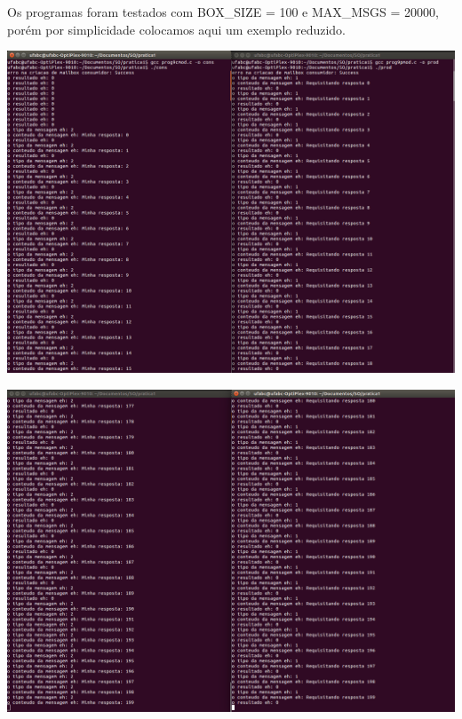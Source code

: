 Os programas foram testados com BOX{\_}SIZE = 100 e MAX{\_}MSGS = 20000, porém por simplicidade colocamos aqui um exemplo reduzido.

\vspace{2em}
\begin{minipage}{\textwidth}
    \hspace{-1em}
    \centering
    \includegraphics[trim=0 0 0 0,clip,scale=.3]{pratica1/prog9mod.png}
    \label{prog4modpng}
    \hspace{1em}
\end{minipage}

\vspace{2em}
\begin{minipage}{\textwidth}
    \hspace{-1em}
    \centering
    \includegraphics[trim=0 0 0 0,clip,scale=.3]{pratica1/prog9modcont.png}
    \label{prog4modpng}
    \hspace{1em}
\end{minipage}